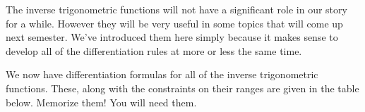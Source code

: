 


The inverse trigonometric functions will not have a significant role
in our story for a while. However they will be very useful in some
topics that will come up next semester. We've introduced them here
simply because it makes sense to develop all of the differentiation
rules at more or less the same time.

We now have  differentiation formulas for all of the inverse
trigonometric functions. These, along with the constraints on their
ranges are given in the table below.
\alert{Memorize them!} You will need them.

